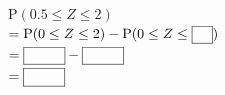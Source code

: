\noindent\begin{minipage}[t]{0.58\linewidth}\vspace{0pt}\raggedright $\mathrm{P}(0.5\le Z\le 2)$\\ $=\mathrm{P}(0\le Z\le 2)-\mathrm{P}(0\le Z\le\blank)$\\ $=\blank[3em]-\blank[3em]$\\ $=\blank[3em]$\end{minipage}\hfill\begin{minipage}[t]{0.4\linewidth}\vspace{0pt}\centering \resizebox{\ifdim\width>\linewidth\linewidth\else\width\fi}{!}{}\end{minipage}\par
